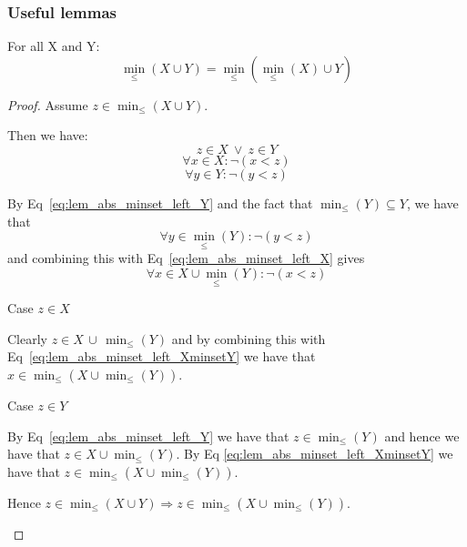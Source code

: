 \documentclass[../Summary.tex]{subfiles}
\begin{document}
\subsubsection{Useful lemmas}

\begin{lemma} \label{lem:minunion_left_absorption}
For all X and Y:
\begin{equation*}
\min_\leq(X \cup Y) = \min_\leq(\min_\leq(X) \cup Y)
\end{equation*}
\end{lemma}

\begin{proof}
Assume $z \in \min_\leq(X \cup Y)$. 
\begin{ind}
Then we have:
\begin{equation}
z \in X \ \vee \ z \in Y
\end{equation}
\begin{equation} \label{eq:lem_abs_minset_left_X}
\forall x \in X : \neg (x < z)
\end{equation}
\begin{equation} \label{eq:lem_abs_minset_left_Y}
\forall y \in Y : \neg (y < z)
\end{equation}

By Eq~\ref{eq:lem_abs_minset_left_Y} and the fact that $\min_\leq(Y) \subseteq Y$, we have that
\begin{equation*} 
\forall y \in \min_\leq(Y) : \neg (y < z)
\end{equation*}
and combining this with Eq~\ref{eq:lem_abs_minset_left_X} gives
\begin{equation} \label{eq:lem_abs_minset_left_XminsetY}
\forall x \in X \cup \min_\leq(Y) : \neg (x < z)
\end{equation}

Case $z \in X$
\begin{ind}
Clearly $z \in X \, \cup \, \min_\leq(Y)$ and by combining this with Eq~\ref{eq:lem_abs_minset_left_XminsetY} we have that $x \in \min_\leq(X \cup \min_\leq(Y))$.
\end{ind}

Case $z \in Y$
\begin{ind}
By Eq~\ref{eq:lem_abs_minset_left_Y} we have that $z \in \min_\leq(Y)$ and hence we have that $z \in X \cup \min_\leq(Y)$. By Eq \ref{eq:lem_abs_minset_left_XminsetY} we have that $z \in \min_\leq(X \cup \min_\leq(Y))$.
\end{ind}

Hence $z \in \min_\leq(X \cup Y) \Rightarrow z \in \min_\leq(X \cup \min_\leq(Y))$.
\end{ind}


\end{proof}
\end{document}
